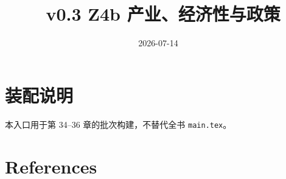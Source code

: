 \documentclass[UTF8,a4paper,12pt,openany]{ctexbook}
\title{\ReportTitle\ v0.3 Z4b 产业、经济性与政策}
\author{\ReportAuthor}
\date{2026-07-14}
\begin{document}
\frontmatter
\maketitle
\chapter*{装配说明}
本入口用于第 34--36 章的批次构建，不替代全书 \texttt{main.tex}。
\tableofcontents
\mainmatter
\setcounter{chapter}{33}



\backmatter
\chapter{References}
\printbibliography[heading=none]
\end{document}
